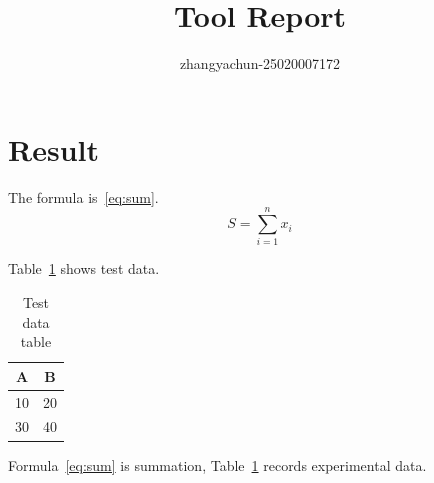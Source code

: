\documentclass{article}
\begin{document}
\title{Tool Report}
\author{zhangyachun-25020007172}
\maketitle

\section{Result}

The formula is~\eqref{eq:sum}.
\begin{equation}
\label{eq:sum}
S = \sum_{i=1}^{n} x_i
\end{equation}

Table~\ref{tab:data} shows test data.
\begin{table}[h]
\centering
\caption{Test data table}
\label{tab:data}
\begin{tabular}{|c|c|}
\hline
A & B \\
\hline
10 & 20 \\
\hline
30 & 40 \\
\hline
\end{tabular}
\end{table}

Formula~\ref{eq:sum} is summation, Table~\ref{tab:data} records experimental data.
\end{document}
